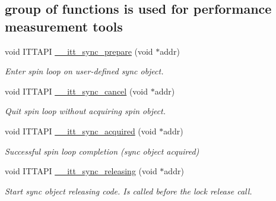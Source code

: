 \subsection*{group of functions is used for performance measurement tools}
\begin{DoxyCompactItemize}
\item 
\hypertarget{group__sync_ga27637e91541f997e5e9369a04f094721}{}void I\+T\+T\+A\+P\+I \hyperlink{group__sync_ga27637e91541f997e5e9369a04f094721}{\+\_\+\+\_\+itt\+\_\+sync\+\_\+prepare} (void $\ast$addr)\label{group__sync_ga27637e91541f997e5e9369a04f094721}

\begin{DoxyCompactList}\small\item\em Enter spin loop on user-\/defined sync object. \end{DoxyCompactList}\item 
\hypertarget{group__sync_gadf4d915083aa5ab2193ef5d1b0987e01}{}void I\+T\+T\+A\+P\+I \hyperlink{group__sync_gadf4d915083aa5ab2193ef5d1b0987e01}{\+\_\+\+\_\+itt\+\_\+sync\+\_\+cancel} (void $\ast$addr)\label{group__sync_gadf4d915083aa5ab2193ef5d1b0987e01}

\begin{DoxyCompactList}\small\item\em Quit spin loop without acquiring spin object. \end{DoxyCompactList}\item 
\hypertarget{group__sync_ga3a08077b82c93d544473e6155a1e66c6}{}void I\+T\+T\+A\+P\+I \hyperlink{group__sync_ga3a08077b82c93d544473e6155a1e66c6}{\+\_\+\+\_\+itt\+\_\+sync\+\_\+acquired} (void $\ast$addr)\label{group__sync_ga3a08077b82c93d544473e6155a1e66c6}

\begin{DoxyCompactList}\small\item\em Successful spin loop completion (sync object acquired) \end{DoxyCompactList}\item 
\hypertarget{group__sync_gadde263abd14a8ff4b88edf8afd86f7a2}{}void I\+T\+T\+A\+P\+I \hyperlink{group__sync_gadde263abd14a8ff4b88edf8afd86f7a2}{\+\_\+\+\_\+itt\+\_\+sync\+\_\+releasing} (void $\ast$addr)\label{group__sync_gadde263abd14a8ff4b88edf8afd86f7a2}

\begin{DoxyCompactList}\small\item\em Start sync object releasing code. Is called before the lock release call. \end{DoxyCompactList}\end{DoxyCompactItemize}


